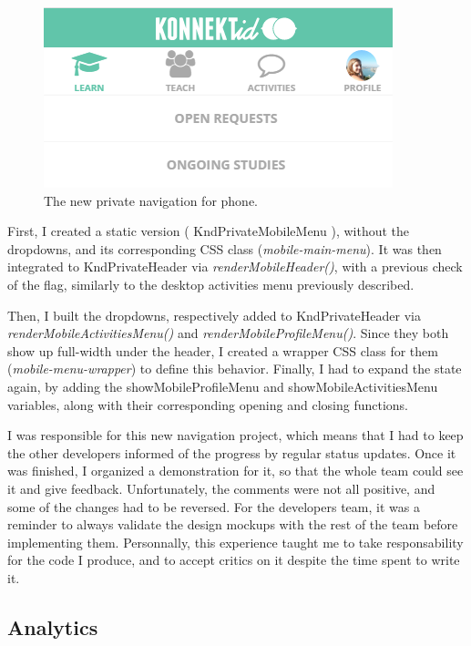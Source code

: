 \begin{figure}[H]
    \centering
    \includegraphics{figure/newNavPhone.png}
    \caption{The new private navigation for phone.}
    \label{fig:newNavPhone}
\end{figure}

First, I created a static version (\guillemotleft{} KndPrivateMobileMenu \guillemotright{}), without the dropdowns, and its corresponding CSS class (\textit{mobile-main-menu}). It was then integrated to KndPrivateHeader via \textit{renderMobileHeader()}, with a previous check of the flag, similarly to the desktop activities menu previously described.

Then, I built the dropdowns, respectively added to KndPrivateHeader via \textit{renderMobileActivitiesMenu()} and \textit{renderMobileProfileMenu()}. Since they both show up full-width under the header, I created a wrapper CSS class for them (\textit{mobile-menu-wrapper}) to define this behavior. Finally, I had to expand the state again, by adding the \guillemotleft{} showMobileProfileMenu \guillemotright{} and \guillemotleft{} showMobileActivitiesMenu \guillemotright{} variables, along with their corresponding opening and closing functions. 

I was responsible for this new navigation project, which means that I had to keep the other developers informed of the progress by regular status updates. Once it was finished, I organized a demonstration for it, so that the whole team could see it and give feedback. Unfortunately, the comments were not all positive, and some of the changes had to be reversed. For the developers team, it was a reminder to always validate the design mockups with the rest of the team before implementing them. Personnally, this experience taught me to take responsability for the code I produce, and to accept critics on it despite the time spent to write it.

\subsection{Analytics}
\label{ssec:analytics}

